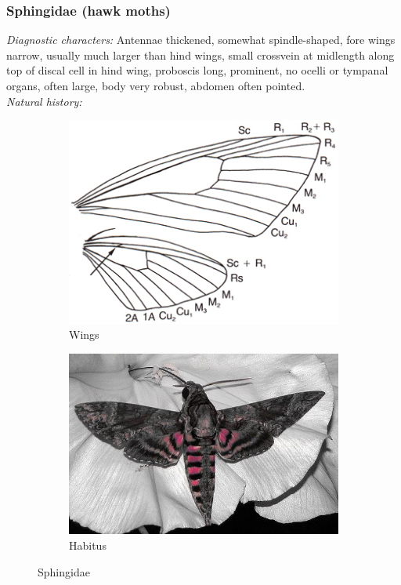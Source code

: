 \documentclass[letterpaper, 11pt]{article}
\begin{document}
\subsubsection{Sphingidae (hawk moths)}
\noindent{}\textit{Diagnostic characters:} Antennae thickened, somewhat spindle-shaped, fore wings narrow, usually much larger than hind wings, small crossvein at midlength along top of discal cell in hind wing, proboscis long, prominent, no ocelli or tympanal organs, often large, body very robust, abdomen often pointed.\\

\noindent{}\textit{Natural history:} 

\begin{figure}[ht!]
    \centering
    \begin{subfigure}[ht!]{0.35\textwidth}
        \includegraphics[width=\textwidth]{image15}
        \caption{Wings}
        \label{fig:sphingid1}
    \end{subfigure}
    \qquad %
    \begin{subfigure}[ht!]{0.4\textwidth}
        \includegraphics[width=\textwidth]{image14}
        \caption{Habitus}
        \label{fig:sphingid2}
    \end{subfigure}
    \caption{Sphingidae}\label{fig:sphingids}
\end{figure}
\end{document}
